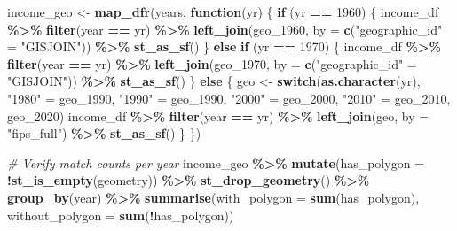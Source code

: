 \documentclass[
]{article}
\newenvironment{Shaded}{\begin{snugshade}}{\end{snugshade}}
\newcommand{\AttributeTok}[1]{\textcolor[rgb]{0.13,0.29,0.53}{#1}}
\newcommand{\CommentTok}[1]{\textcolor[rgb]{0.56,0.35,0.01}{\textit{#1}}}
\newcommand{\ControlFlowTok}[1]{\textcolor[rgb]{0.13,0.29,0.53}{\textbf{#1}}}
\newcommand{\DecValTok}[1]{\textcolor[rgb]{0.00,0.00,0.81}{#1}}
\newcommand{\FunctionTok}[1]{\textcolor[rgb]{0.13,0.29,0.53}{\textbf{#1}}}
\newcommand{\NormalTok}[1]{#1}
\newcommand{\OtherTok}[1]{\textcolor[rgb]{0.56,0.35,0.01}{#1}}
\newcommand{\SpecialCharTok}[1]{\textcolor[rgb]{0.81,0.36,0.00}{\textbf{#1}}}
\newcommand{\StringTok}[1]{\textcolor[rgb]{0.31,0.60,0.02}{#1}}
\begin{document}
\begin{Shaded}
\begin{Highlighting}[]
\NormalTok{income\_geo }\OtherTok{\textless{}{-}} \FunctionTok{map\_dfr}\NormalTok{(years, }\ControlFlowTok{function}\NormalTok{(yr) \{}
  \ControlFlowTok{if}\NormalTok{ (yr }\SpecialCharTok{==} \DecValTok{1960}\NormalTok{) \{}
\NormalTok{    income\_df }\SpecialCharTok{\%\textgreater{}\%}
      \FunctionTok{filter}\NormalTok{(year }\SpecialCharTok{==}\NormalTok{ yr) }\SpecialCharTok{\%\textgreater{}\%}
      \FunctionTok{left\_join}\NormalTok{(geo\_1960, }\AttributeTok{by =} \FunctionTok{c}\NormalTok{(}\StringTok{"geographic\_id"} \OtherTok{=} \StringTok{"GISJOIN"}\NormalTok{)) }\SpecialCharTok{\%\textgreater{}\%}
      \FunctionTok{st\_as\_sf}\NormalTok{()}
\NormalTok{  \} }\ControlFlowTok{else} \ControlFlowTok{if}\NormalTok{ (yr }\SpecialCharTok{==} \DecValTok{1970}\NormalTok{) \{}
\NormalTok{    income\_df }\SpecialCharTok{\%\textgreater{}\%}
      \FunctionTok{filter}\NormalTok{(year }\SpecialCharTok{==}\NormalTok{ yr) }\SpecialCharTok{\%\textgreater{}\%}
      \FunctionTok{left\_join}\NormalTok{(geo\_1970, }\AttributeTok{by =} \FunctionTok{c}\NormalTok{(}\StringTok{"geographic\_id"} \OtherTok{=} \StringTok{"GISJOIN"}\NormalTok{)) }\SpecialCharTok{\%\textgreater{}\%}
      \FunctionTok{st\_as\_sf}\NormalTok{()}
\NormalTok{  \} }\ControlFlowTok{else}\NormalTok{ \{}
\NormalTok{    geo }\OtherTok{\textless{}{-}} \ControlFlowTok{switch}\NormalTok{(}\FunctionTok{as.character}\NormalTok{(yr),}
      \StringTok{"1980"} \OtherTok{=}\NormalTok{ geo\_1990,}
      \StringTok{"1990"} \OtherTok{=}\NormalTok{ geo\_1990,}
      \StringTok{"2000"} \OtherTok{=}\NormalTok{ geo\_2000,}
      \StringTok{"2010"} \OtherTok{=}\NormalTok{ geo\_2010,}
\NormalTok{      geo\_2020)}
\NormalTok{    income\_df }\SpecialCharTok{\%\textgreater{}\%}
      \FunctionTok{filter}\NormalTok{(year }\SpecialCharTok{==}\NormalTok{ yr) }\SpecialCharTok{\%\textgreater{}\%}
      \FunctionTok{left\_join}\NormalTok{(geo, }\AttributeTok{by =} \StringTok{"fips\_full"}\NormalTok{) }\SpecialCharTok{\%\textgreater{}\%}
      \FunctionTok{st\_as\_sf}\NormalTok{()}
\NormalTok{  \}}
\NormalTok{\})}

\CommentTok{\# Verify match counts per year}
\NormalTok{income\_geo }\SpecialCharTok{\%\textgreater{}\%}
  \FunctionTok{mutate}\NormalTok{(}\AttributeTok{has\_polygon =} \SpecialCharTok{!}\FunctionTok{st\_is\_empty}\NormalTok{(geometry)) }\SpecialCharTok{\%\textgreater{}\%}
  \FunctionTok{st\_drop\_geometry}\NormalTok{() }\SpecialCharTok{\%\textgreater{}\%}
  \FunctionTok{group\_by}\NormalTok{(year) }\SpecialCharTok{\%\textgreater{}\%}
  \FunctionTok{summarise}\NormalTok{(}\AttributeTok{with\_polygon =} \FunctionTok{sum}\NormalTok{(has\_polygon), }\AttributeTok{without\_polygon =} \FunctionTok{sum}\NormalTok{(}\SpecialCharTok{!}\NormalTok{has\_polygon))}
\end{Highlighting}
\end{Shaded}
\end{document}
